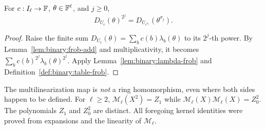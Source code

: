 \begin{corollary}\label{cor:binary:fold-frob}
For $c:I_\ell\to\mathbb{F}$, $\theta\in\mathbb{F}^\ell$, and $j\geq0$,
\[
 \boxed{D_{U_c}(\theta)^{2^j}
 =D_{U_{c^{\sigma_j}}}(\theta^{\sigma_j}).}
\]
\end{corollary}
\begin{proof}
Raise the finite sum
$D_{U_c}(\theta)=\sum_bc(b)\lambda_b(\theta)$
to its $2^j$-th power.
By Lemma~\ref{lem:binary:frob-add} and multiplicativity,
it becomes $\sum_bc(b)^{2^j}\lambda_b(\theta)^{2^j}$.
Apply Lemma~\ref{lem:binary:lambda-frob}
and Definition~\ref{def:binary:table-frob}.
\end{proof}

\begin{remark}
The multilinearization map is \emph{not} a ring homomorphism,
even where both sides happen to be defined.
For $\ell\geq2$,
$\mathscr M_\ell(X^2)=Z_1$ while
$\mathscr M_\ell(X)\mathscr M_\ell(X)=Z_0^2$.
The polynomials $Z_1$ and $Z_0^2$ are distinct.
All foregoing kernel identities were proved from expansions
and the linearity of $\mathscr M_\ell$.
\end{remark}
